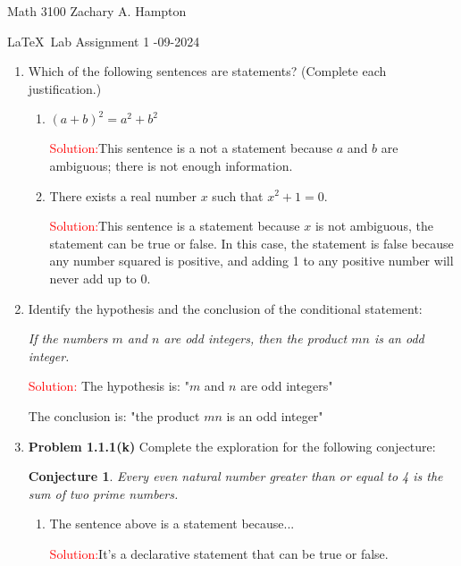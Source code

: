 \documentclass[12pt]{article}
\newtheorem*{conjecture}{Conjecture}
\theoremstyle{definition}
\newcommand{\solution}{\textcolor{Red}{Solution:\newline}}
\begin{document}
Math 3100 \hfill Zachary A. Hampton

\LaTeX~Lab Assignment 1 \hfill 
{}-09-2024

\bigskip

\begin{enumerate}
    \item Which of the following sentences are statements? (Complete each justification.)
    
    \begin{enumerate}
        \item $(a+b)^2=a^2 + b^2$
    
        
       \solution This sentence is a not a statement because $a$ and $b$ are ambiguous; there is not enough information.
        
        \item There exists a real number $x$ such that $x^2 + 1 = 0$.
        
       \solution This sentence is a statement because $x$ is not ambiguous, the statement can be true or false. In this case, the statement is false because any number squared is positive, and adding 1 to any positive number will never add up to 0.
       
    \end{enumerate}
    
    \item Identify the hypothesis and the conclusion of the conditional statement:
    
   \textit{If the numbers $m$ and $n$ are odd integers, then the product $mn$ is an odd integer.}
    
   \solution
    The hypothesis is: "$m$ and $n$ are odd integers"
    
    The conclusion is: "the product $m$$n$ is an odd integer"
    
    \item \textbf{Problem 1.1.1(k)} Complete the exploration for the following conjecture:
 
    \begin{conjecture}
    Every even natural number greater than or equal to 4 is the sum of two prime numbers.
    \end{conjecture}

        \begin{enumerate}[label=(\alph*)]
            \item The sentence above is a statement because...

            \solution It's a declarative statement that can be true or false.
            

\end{enumerate}
\end{enumerate}
\end{document}
